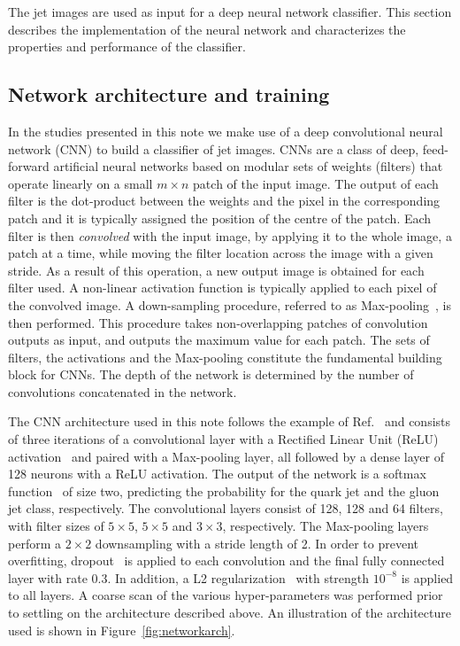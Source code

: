 
The jet images are used as input for a deep neural network classifier.
This section describes the implementation of the neural network and characterizes the properties and performance of the classifier.

\subsection{Network architecture and training}

In the studies presented in this note we make use of a deep convolutional neural network (CNN) to build a classifier of jet images.
CNNs are a class of deep, feed-forward artificial neural networks based on modular sets of weights (filters) that operate linearly on a small $m\times n$
patch of the input image. The output of each filter is the dot-product between the weights and the pixel in the corresponding patch and it is typically assigned the position of the
centre of the patch.
Each filter is then \emph{convolved} with the input image, by applying it to the whole image, a patch at a time, while moving the filter location across the image with a given stride.
As a result of this operation, a new output image is obtained for each filter used.
A non-linear activation function is typically applied to each pixel of the convolved image.
A down-sampling procedure, referred to as Max-pooling~\cite{MAXPOOL}, is then performed.
This procedure takes non-overlapping patches of convolution outputs as input, and outputs the maximum value for each patch.
The sets of filters, the activations and the Max-pooling constitute the fundamental building block for CNNs.
The depth of the network is determined by the number of convolutions concatenated in the network.

The CNN architecture used in this note follows the example of Ref.~\cite{Komiske:2016rsd} and consists of three iterations of a convolutional layer with a
Rectified Linear Unit (ReLU) activation~\cite{RELU} and paired with a Max-pooling layer,
all followed by a dense layer of 128 neurons with a ReLU activation. The output of the network is a softmax function~\cite{Goodfellow-et-al-2016-Book} of size two, 
predicting the probability for the quark jet and the gluon jet class, respectively. 
The convolutional layers consist of 128, 128 and 64 filters, with filter sizes of $5\times5$, $5\times5$ and $3\times3$, respectively.
The Max-pooling layers perform a $2\times2$ downsampling with a stride length of 2.
In order to prevent overfitting, dropout~\cite{Goodfellow-et-al-2016-Book} is applied to each convolution and the final fully connected layer with rate 0.3.
In addition, a L2 regularization~\cite{Goodfellow-et-al-2016-Book} with strength $10^{-8}$ is applied to all layers.  
A coarse scan of the various hyper-parameters was performed prior to settling on the architecture described above.
An illustration of the architecture used is shown in Figure~\ref{fig:networkarch}.

